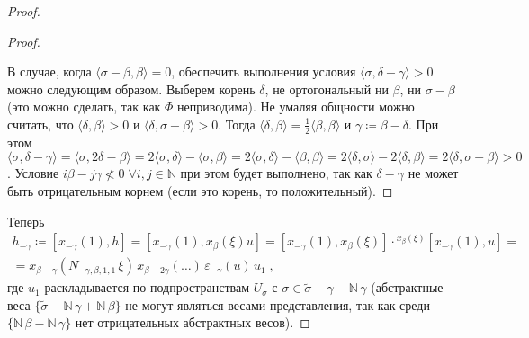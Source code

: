 \documentclass[10pt]{article}
\theoremstyle{remark}
\newcommand{\N}{\mathbb{N}}
\begin{document}
\begin{proof}
\begin{proof}
\begin{center}
\end{center}

В случае, когда $\langle\sigma-\beta,\beta\rangle=0$, обеспечить выполнения условия $\langle\sigma,\delta-\gamma\rangle>0$ можно следующим образом. Выберем корень $\delta$, не ортогональный ни $\beta$, ни $\sigma-\beta$ (это можно сделать, так как $\Phi$ неприводима). Не умаляя общности можно считать, что $\langle\delta,\beta\rangle>0$ и $\langle\delta,\sigma-\beta\rangle>0$. Тогда $\langle\delta,\beta\rangle=\frac{1}{2}\langle\beta,\beta\rangle$ и $\gamma\coloneqq\beta-\delta$. При этом
$\langle\sigma,\delta-\gamma\rangle =
\langle\sigma,2\delta-\beta\rangle =
2\langle\sigma,\delta\rangle-\langle\sigma,\beta\rangle = 
2\langle\sigma,\delta\rangle-\langle\beta,\beta\rangle =
2\langle\delta,\sigma\rangle-2\langle\delta,\beta\rangle =
2\langle\delta,\sigma-\beta\rangle > 0$.
Условие $i\beta-j\gamma\nless0\;\forall i,j\in\N$ при этом будет выполнено, так как  $\delta-\gamma$ не может быть отрицательным корнем (если это корень, то положительный).
\end{proof}

Теперь
\begin{multline*}
h_{-\gamma} \coloneqq [x_{-\gamma}(1),h] = [x_{-\gamma}(1),x_\beta(\xi) u] = [x_{-\gamma}(1),x_\beta(\xi)] \cdot {}^{x_\beta(\xi)}[x_{-\gamma}(1),u] = \\ =
x_{\beta-\gamma}(N_{-\gamma,\beta,1,1} \,\xi) \, x_{\beta-2\gamma}(\ldots) \, \varepsilon_{-\gamma}(u) \, u_1 \; ,
\end{multline*}
где $u_1$ раскладывается по подпространствам $U_\sigma$ с $\sigma \in \widetilde\sigma-\gamma - \N \, \gamma$ (абстрактные веса $\{\widetilde\sigma-\N\,\gamma+\N\,\beta\}$ не могут являться весами представления, так как среди $\{\N\,\beta-\N\,\gamma\}$ нет отрицательных абстрактных весов).


\end{proof}
\end{document}
